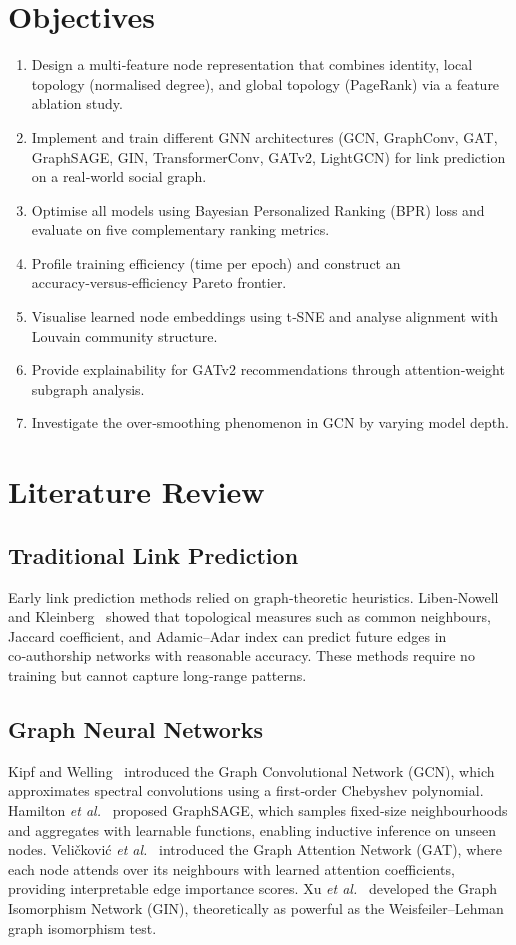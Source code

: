 \documentclass[conference]{IEEEtran}
\begin{document}
\section{Objectives}\label{sec:objectives}
\begin{enumerate}[label=\textbf{O\arabic*.}]
  \item Design a multi‑feature node representation that combines identity, local topology (normalised degree), and global topology (PageRank) via a feature ablation study.
  \item Implement and train different GNN architectures (GCN, GraphConv, GAT, GraphSAGE, GIN, TransformerConv, GATv2, LightGCN) for link prediction on a real‑world social graph.
  \item Optimise all models using Bayesian Personalized Ranking (BPR) loss and evaluate on five complementary ranking metrics.
  \item Profile training efficiency (time per epoch) and construct an accuracy‑versus‑efficiency Pareto frontier.
  \item Visualise learned node embeddings using t‑SNE and analyse alignment with Louvain community structure.
  \item Provide explainability for GATv2 recommendations through attention‑weight subgraph analysis.
  \item Investigate the over‑smoothing phenomenon in GCN by varying model depth.
\end{enumerate}

\section{Literature Review}\label{sec:litreview}
\subsection{Traditional Link Prediction}
Early link prediction methods relied on graph‑theoretic heuristics. Liben‑Nowell and Kleinberg~\cite{libennowell2007} showed that topological measures such as common neighbours, Jaccard coefficient, and Adamic--Adar index can predict future edges in co‑authorship networks with reasonable accuracy. These methods require no training but cannot capture long‑range patterns.

\subsection{Graph Neural Networks}
Kipf and Welling~\cite{kipf2017} introduced the Graph Convolutional Network (GCN), which approximates spectral convolutions using a first‑order Chebyshev polynomial. Hamilton \textit{et al.}~\cite{hamilton2017} proposed GraphSAGE, which samples fixed‑size neighbourhoods and aggregates with learnable functions, enabling inductive inference on unseen nodes. Veli\v{c}kovi\'c \textit{et al.}~\cite{velickovic2018} introduced the Graph Attention Network (GAT), where each node attends over its neighbours with learned attention coefficients, providing interpretable edge importance scores. Xu \textit{et al.}~\cite{xu2019} developed the Graph Isomorphism Network (GIN), theoretically as powerful as the Weisfeiler–Lehman graph isomorphism test.
\end{document}

